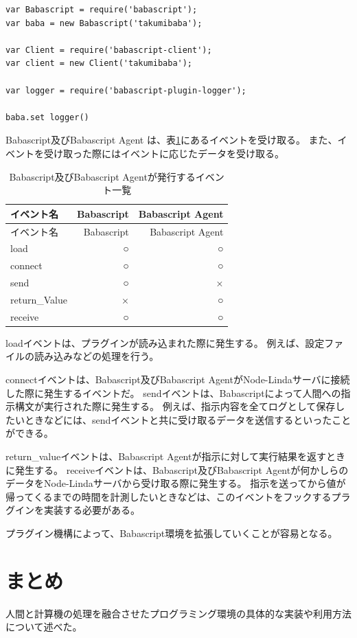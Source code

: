 \begin{lstlisting}[caption=Babascript Plugin, label=code:babascript-plugin]
var Babascript = require('babascript');
var baba = new Babascript('takumibaba');

var Client = require('babascript-client');
var client = new Client('takumibaba');

var logger = require('babascript-plugin-logger');

baba.set logger()
\end{lstlisting}

Babascript及びBabascript Agent
は、表\ref{table:plugin-events}にあるイベントを受け取る。
また、イベントを受け取った際にはイベントに応じたデータを受け取る。

\begin{longtable}[c]{@{}lrr@{}}
\caption{Babascript及びBabascript Agentが発行するイベント一覧
\label{table:plugin-events}}\tabularnewline
\toprule
イベント名 & Babascript & Babascript Agent\tabularnewline
\midrule
\endfirsthead
\toprule
イベント名 & Babascript & Babascript Agent\tabularnewline
\midrule
\endhead
load & ○ & ○\tabularnewline
connect & ○ & ○\tabularnewline
send & ○ & ×\tabularnewline
return\_Value & × & ○\tabularnewline
receive & ○ & ○\tabularnewline
\bottomrule
\end{longtable}

loadイベントは、プラグインが読み込まれた際に発生する。
例えば、設定ファイルの読み込みなどの処理を行う。

connectイベントは、Babascript及びBabascript
AgentがNode-Lindaサーバに接続した際に発生するイベントだ。
sendイベントは、Babascriptによって人間への指示構文が実行された際に発生する。
例えば、指示内容を全てログとして保存したいときなどには、sendイベントと共に受け取るデータを送信するといったことができる。

return\_valueイベントは、Babascript
Agentが指示に対して実行結果を返すときに発生する。
receiveイベントは、Babascript及びBabascript
Agentが何かしらのデータをNode-Lindaサーバから受け取る際に発生する。
指示を送ってから値が帰ってくるまでの時間を計測したいときなどは、このイベントをフックするプラグインを実装する必要がある。

プラグイン機構によって、Babascript環境を拡張していくことが容易となる。

\section{まとめ}\label{ux307eux3068ux3081}

人間と計算機の処理を融合させたプログラミング環境の具体的な実装や利用方法について述べた。
